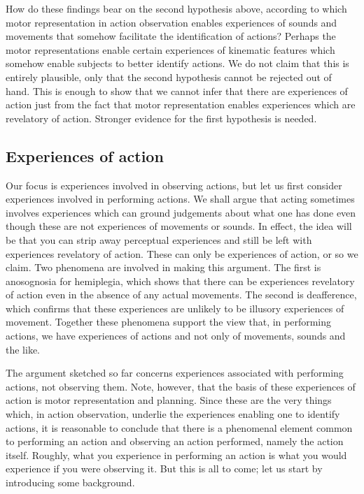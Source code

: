 \documentclass[12pt,\papersize]{extarticle}
\begin{document}
How do these findings bear on the second hypothesis above, according to which motor representation in action observation enables experiences of sounds and movements that somehow facilitate the identification of actions?  Perhaps the motor representations enable certain experiences of kinematic features which somehow enable subjects to better identify actions.  We do not claim that this is entirely plausible, only that the second hypothesis cannot be rejected out of hand.  This is enough to show that we cannot infer that there are experiences of action just from the fact that motor representation enables experiences which are revelatory of action.  Stronger evidence for the first hypothesis is needed.

\subsection{Experiences of action}
Our focus is experiences involved in observing actions, but let us first consider experiences involved in performing actions.  We shall argue that acting sometimes involves experiences which can ground judgements about what one has done even though these are not experiences of movements or sounds.  In effect, the idea will be that you can strip away perceptual experiences and still be left with experiences revelatory of action.  These can only be experiences of action, or so we claim.  Two phenomena are involved in making this argument.  The first is anosognosia for hemiplegia, which shows that there can be experiences revelatory of action even in the absence of any actual movements.  The second is deafference, which confirms that these experiences are unlikely to be illusory experiences of movement. Together these phenomena support the view that, in performing actions, we have experiences of actions and not only of movements, sounds and the like.  

The argument sketched so far concerns experiences associated with performing actions, not observing them.  Note, however, that the basis of these experiences of action is motor representation and planning.  Since these are the very things which, in action observation, underlie the experiences enabling one to identify actions, it is reasonable to conclude that there is a phenomenal element common to performing an action and observing an action performed, namely the action itself.  Roughly, what you experience in performing an action is what you would experience if you were observing it.  But this is all to come; let us start by introducing some background. 
\end{document}
